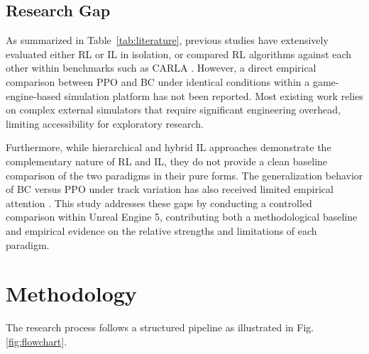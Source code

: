 \documentclass[conference]{IEEEtran}
\begin{document}
\subsection{Research Gap}

\text As summarized in Table~\ref{tab:literature}, previous studies have extensively evaluated either RL or IL in isolation, or compared RL algorithms against each other within benchmarks such as CARLA \cite{muzahid2021comparison, siboo2024empirical, huang2022distributed}. However, a direct empirical comparison between PPO and BC under identical conditions within a game-engine-based simulation platform has not been reported. Most existing work relies on complex external simulators that require significant engineering overhead, limiting accessibility for exploratory research.

\text Furthermore, while hierarchical and hybrid IL approaches \cite{bronstein2022hierarchical} demonstrate the complementary nature of RL and IL, they do not provide a clean baseline comparison of the two paradigms in their pure forms. The generalization behavior of BC versus PPO under track variation has also received limited empirical attention \cite{chen2024endtoend, ross2011reduction}. This study addresses these gaps by conducting a controlled comparison within Unreal Engine 5, contributing both a methodological baseline and empirical evidence on the relative strengths and limitations of each paradigm.

\section{Methodology} \label{sec:methodology}

The research process follows a structured pipeline as illustrated in Fig. \ref{fig:flowchart}.
\end{document}

